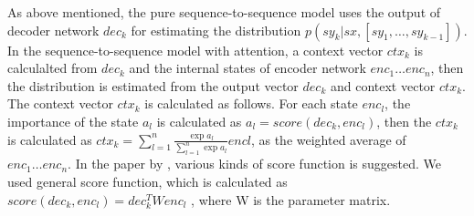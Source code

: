 \documentclass[senior,final,11pt]{iscs-thesis}
\begin{document}
As above mentioned, the pure sequence-to-sequence model uses the output of decoder network $ dec_{k} $ for estimating 
the distribution $ p(sy_k|sx,[sy_1,\dots,sy_{k-1}]) $.
In the sequence-to-sequence model with attention, 
a context vector $ ctx_{k} $ is calculalted from $ dec_{k} $ and the internal states of encoder network $ enc_{1} \dots enc_{n} $, 
then the distribution is estimated from the output vector $ dec_{k} $ and context vector $ ctx_{k} $.
The context vector $ ctx_{k} $ is calculated as follows.
For each state $ enc_{l} $, the importance of the state $ a_{l} $ is calculated as $ a_{l} = score(dec_{k},enc_{l}) $,
then the $ ctx_{k} $ is calculated as $ ctx_{k} = \sum_{l=1}^{n} \frac{\exp{a_{l}}}{\sum_{l=1}^{n}\exp{a_{l}}} enc{l} $, 
as the weighted average of $ enc_{1} \dots enc_{n} $.
In the paper by \citet{dot_attention}, various kinds of score function is suggested.
We used general score function, which is calculated as $ score(dec_{k},enc_{l}) = dec_{k}^T W enc_{l} $ ,
where W is the parameter matrix. 






\end{document}
